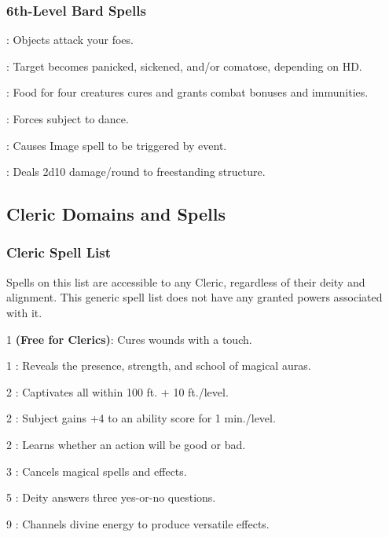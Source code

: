 \subsubsection{6th-Level Bard Spells}
\begin{list}{}{\leftmargin=1em}
\item {}: Objects attack your foes.
\item {}: Target becomes panicked, sickened, and/or comatose, depending on HD.
\item {}: Food for four creatures cures and grants combat bonuses and immunities.
\item {}: Forces subject to dance.
\item {}: Causes Image spell to be triggered by event.
\item {}: Deals 2d10 damage/round to freestanding structure.
\end{list}
\subsection{Cleric Domains and Spells}
\label{sec:ClericDomains}
\subsubsection{Cleric Spell List}
\label{Domain:General}
Spells on this list are accessible to any Cleric, regardless of their deity and alignment. This generic spell list does not have any granted powers associated with it.
\begin{list}{}{\leftmargin=1em}
  \item[1]  \textbf{(Free for Clerics)}: Cures wounds with a touch.
  \item[1] : Reveals the presence, strength, and school of magical auras.
  \item[2] : Captivates all within 100 ft. + 10 ft./level.
  \item[2] : Subject gains +4 to an ability score for 1 min./level.
  \item[2] : Learns whether an action will be good or bad.
  \item[3] : Cancels magical spells and effects.
  \item[5] : Deity answers three yes-or-no questions.
  \item[9] : Channels divine energy to produce versatile effects.
\end{list}
